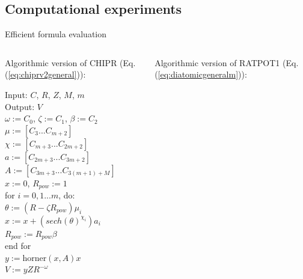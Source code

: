 \documentclass{beamer}
\newcommand\Fontvi{\fontsize{8}{7.2}\selectfont} %
\newenvironment{ppl}{\fontfamily{ppl}\selectfont}{\par}
\def\spc{\hspace*{0.5cm}} 			%
\begin{document}
\subsection{Computational experiments}
\begin{frame}{Efficient formula evaluation}
    \Fontvi
    \begin{columns}[c]
        \begin{column}{0.5\textwidth}
            Algorithmic version of CHIPR (Eq.(\ref{eq:chiprv2general})):
            \begin{ppl}
            
                \vspace{0.2cm}
                Input: $C$, $R$, $Z$, $M$, $m$\\
                Output: $V$ \\
                $\omega := C_0$, $\zeta := C_1$, $\beta := C_2$ \\
                $\mu := [C_3...C_{m+2}]$ \\
                $\chi := [C_{m+3}...C_{2m+2}]$ \\
                $a := [C_{2m+3}...C_{3m+2}]$ \\
                $A := [C_{3m+3}...C_{3(m+1)+M}]$ \\
                $x := 0$, $R_{pow} := 1$\\ 
                for $i=0,1 ... m$, do:\\
                    \spc $\theta := (R - \zeta R_{pow})\mu_i$\\
                    \spc $x := x + (sech(\theta)^{\chi_i})a_i$\\
                    \spc $R_{pow} := R_{pow}\beta$\\
                end for \\
                $y := \text{horner}(x, A)x$\\
                $V := yZR^{-\omega}$
            \end{ppl}
        \end{column}
        \vrule{}
        \begin{column}{0.5\textwidth}
            Algorithmic version of RATPOT1  (Eq.(\ref{eq:diatomicgeneralm})):
            \vspace{0.2cm}
            \begin{ppl}
                

\end{ppl}
\end{column}
\end{columns}
\end{frame}
\end{document}
